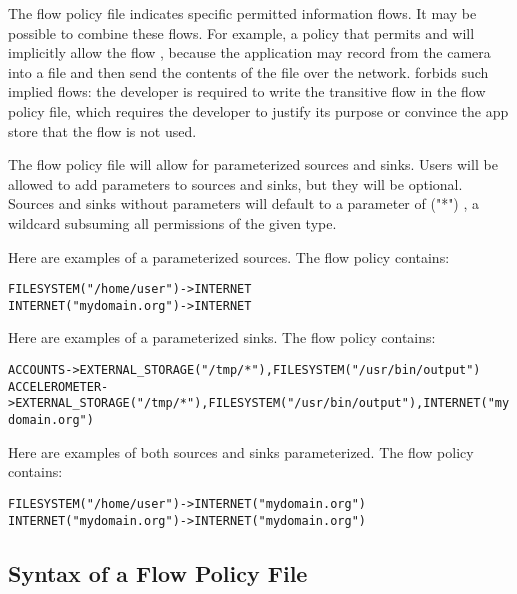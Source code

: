 \label{sec:flow-policy-transitivity}
The flow policy file indicates specific permitted information flows.  It
may be possible to combine these flows.
For example, a policy that permits
 and 
will implicitly allow the flow ,
because the application may record from the camera into a file
and then send the contents of the file over the network.
\TheFlowChecker forbids such implied flows:  the developer is required to write
the transitive flow in the flow policy file, which requires the developer
to justify its purpose or convince the app store that the flow is not used.

\label{sec:flow-policy-parameterized}
The flow policy file will allow for parameterized sources and sinks. Users
will be allowed to add parameters to sources and sinks, but they will be optional.
Sources and sinks without parameters will default to a parameter of ("*") , a 
wildcard subsuming all permissions of the given type.\newline

\noindent
Here are examples of a parameterized sources.
The flow policy contains:
\begin{alltt}
  FILESYSTEM("/home/user") -> INTERNET
  INTERNET("mydomain.org") -> INTERNET
\end{alltt}

\noindent
Here are examples of a parameterized sinks.
The flow policy contains:
\begin{alltt}
  ACCOUNTS      -> EXTERNAL_STORAGE("/tmp/*"), FILESYSTEM("/usr/bin/output")
  ACCELEROMETER -> EXTERNAL_STORAGE("/tmp/*"), FILESYSTEM("/usr/bin/output"), INTERNET("mydomain.org")
\end{alltt}

\noindent
Here are examples of both sources and sinks parameterized.
The flow policy contains:
\begin{alltt}
  FILESYSTEM("/home/user") -> INTERNET("mydomain.org")
  INTERNET("mydomain.org") -> INTERNET("mydomain.org")
\end{alltt}

\subsection{Syntax of a Flow Policy File}

